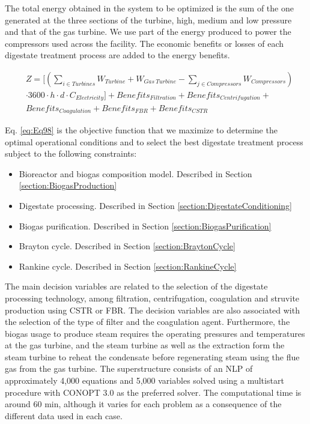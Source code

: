 \begin{refsection}[referencesCh2]
The total energy obtained in the system to be optimized is the sum of the one generated at the three sections of the turbine, high, medium and low pressure and that of the gas turbine. We use part of the energy produced to power the compressors used across the facility. The economic benefits or losses of each digestate treatment process are added to the energy benefits.

\begin{align}
	&Z = \Bigg[ \left( \sum\limits_{i \in Turbines} {W}_{ {Turbine} }  + W_{Gas \ Turbine} - \sum\limits_{j \in Compressors} W_{Compressors}  \right) \label{eq:Eq98} \\ 
	& \cdot 3600\cdot h \cdot d \cdot {C_{Electricity}} \Bigg]+ Benefits_{Filtration} + {Benefits}_{Centrifugation} + \nonumber \\
	& {Benefits}_{Coagulation} + {Benefits}_{FBR} + {Benefits}_{CSTR} \nonumber
\end{align}

Eq. \ref{eq:Eq98} is the objective function that we maximize to determine the optimal operational conditions and to select the best digestate treatment process subject to the following constraints:

\begin{itemize}
	\item Bioreactor and biogas composition model. Described in Section \ref{section:BiogasProduction}
	\item Digestate processing. Described in Section \ref{section:DigestateConditioning}
	\item Biogas purification. Described in Section \ref{section:BiogasPurification}
	\item Brayton cycle. Described in Section \ref{section:BraytonCycle}
	\item Rankine cycle. Described in Section \ref{section:RankineCycle}
\end{itemize}

The main decision variables are related to the selection of the digestate processing technology, among filtration, centrifugation, coagulation and struvite production using CSTR or FBR. The decision variables are also associated with the selection of the type of filter and the coagulation agent. Furthermore, the biogas usage to produce steam requires the operating pressures and temperatures at the gas turbine, and the steam turbine as well as the extraction form the steam turbine to reheat the condensate before regenerating steam using the flue gas from the gas turbine. The superstructure consists of an NLP of approximately 4,000 equations and 5,000 variables solved using a multistart procedure with CONOPT 3.0 as the preferred solver. The computational time is around 60 min, although it varies for each problem as a consequence of the different data used in each case.


\end{refsection}
